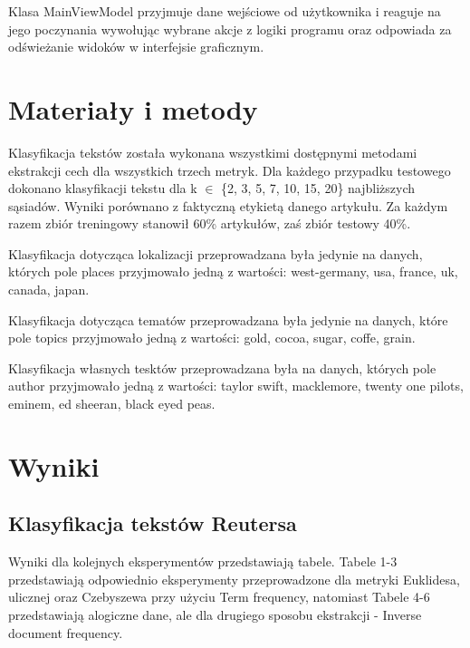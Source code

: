 \documentclass{classrep}
\begin{document}
Klasa MainViewModel przyjmuje dane wejściowe od użytkownika i reaguje na jego poczynania wywołując wybrane akcje z logiki programu oraz odpowiada za odświeżanie widoków w interfejsie graficznym.  


\section{Materiały i metody}

Klasyfikacja tekstów została wykonana wszystkimi dostępnymi metodami ekstrakcji cech dla wszystkich trzech metryk. Dla każdego przypadku testowego dokonano klasyfikacji tekstu dla k $\in$ \{2, 3, 5, 7, 10, 15, 20\} najbliższych sąsiadów. Wyniki porównano z faktyczną etykietą danego artykułu. Za każdym razem zbiór treningowy stanowił 60\% artykułów, zaś zbiór testowy 40\%. \newline

Klasyfikacja dotycząca lokalizacji przeprowadzana była jedynie na danych, których pole places przyjmowało jedną z wartości: west-germany, usa, france, uk, canada, japan. \newline

Klasyfikacja dotycząca tematów przeprowadzana była jedynie na danych, które pole topics przyjmowało jedną z wartości: gold, cocoa, sugar, coffe, grain. \newline

Klasyfikacja własnych tesktów przeprowadzana była na danych, których pole author przyjmowało jedną z wartości: taylor swift, macklemore, twenty one pilots, eminem, ed sheeran, black eyed peas.

\section{Wyniki}

\subsection{Klasyfikacja tekstów Reutersa}

Wyniki dla kolejnych eksperymentów przedstawiają tabele. Tabele 1-3 przedstawiają odpowiednio eksperymenty przeprowadzone dla metryki Euklidesa, ulicznej oraz Czebyszewa przy użyciu Term frequency, natomiast Tabele 4-6 przedstawiają alogiczne dane, ale dla drugiego sposobu ekstrakcji - Inverse document frequency.
\end{document}
